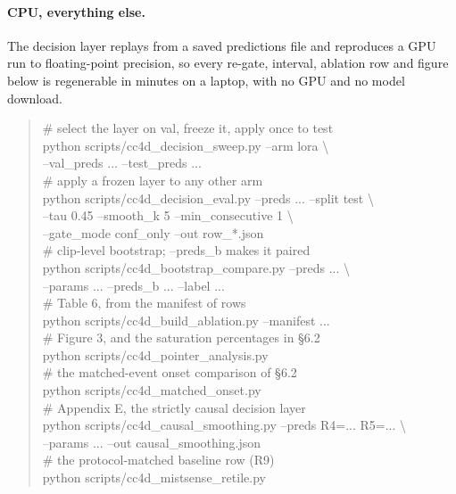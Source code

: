\documentclass[10pt,twocolumn]{article}
\begin{document}
\paragraph{CPU, everything else.} The decision layer replays from a saved
predictions file and reproduces a GPU run to floating-point precision, so every
re-gate, interval, ablation row and figure below is regenerable in minutes on a
laptop, with no GPU and no model download.

\begin{quote}\scriptsize\ttfamily\raggedright
\# select the layer on val, freeze it, apply once to test\\
python scripts/cc4d\_decision\_sweep.py --arm lora \textbackslash\\
\hspace*{1em}--val\_preds ... --test\_preds ...\\[3pt]
\# apply a frozen layer to any other arm\\
python scripts/cc4d\_decision\_eval.py --preds ... --split test \textbackslash\\
\hspace*{1em}--tau 0.45 --smooth\_k 5 --min\_consecutive 1 \textbackslash\\
\hspace*{1em}--gate\_mode conf\_only --out row\_*.json\\[3pt]
\# clip-level bootstrap; --preds\_b makes it paired\\
python scripts/cc4d\_bootstrap\_compare.py --preds ... \textbackslash\\
\hspace*{1em}--params ... --preds\_b ... --label ...\\[3pt]
\# Table 6, from the manifest of rows\\
python scripts/cc4d\_build\_ablation.py --manifest ...\\[3pt]
\# Figure 3, and the saturation percentages in \S6.2\\
python scripts/cc4d\_pointer\_analysis.py\\[3pt]
\# the matched-event onset comparison of \S6.2\\
python scripts/cc4d\_matched\_onset.py\\[3pt]
\# Appendix E, the strictly causal decision layer\\
python scripts/cc4d\_causal\_smoothing.py --preds R4=... R5=... \textbackslash\\
\hspace*{1em}--params ... --out causal\_smoothing.json\\[3pt]
\# the protocol-matched baseline row (R9)\\
python scripts/cc4d\_mistsense\_retile.py
\end{quote}
\end{document}
